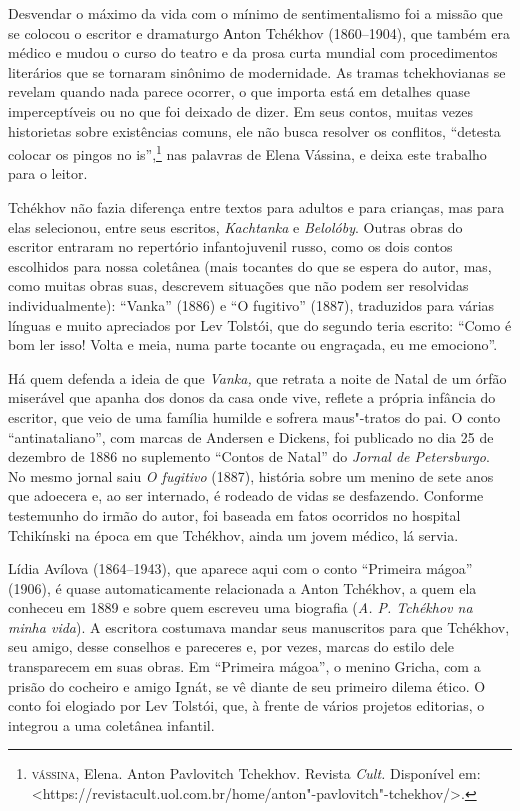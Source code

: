 Desvendar o máximo da vida com o mínimo de sentimentalismo foi a missão
que se colocou o escritor e dramaturgo Аnton Tchékhov (1860--1904), que
também era médico e mudou o curso do teatro e da prosa curta mundial com
procedimentos literários que se tornaram sinônimo de modernidade. As
tramas tchekhovianas se revelam quando nada parece ocorrer, o que
importa está em detalhes quase imperceptíveis ou no que foi deixado de
dizer. Em seus contos, muitas vezes historietas sobre existências
comuns, ele não busca resolver os conflitos, ``detesta colocar os pingos
no is'',\footnote{\textsc{vássina}, Elena. Anton Pavlovitch Tchekhov. Revista
  \emph{Cult.} Disponível em:
  \textless{}https://revistacult.uol.com.br/home/anton"-pavlovitch"-tchekhov/\textgreater{}.}
nas palavras de Elena Vássina, e deixa este trabalho para o leitor.

Tchékhov não fazia diferença entre textos para adultos e para crianças,
mas para elas selecionou, entre seus escritos, \emph{Kachtanka} e
\emph{Belolóby}. Outras obras do escritor entraram no repertório
infantojuvenil russo, como os dois contos escolhidos para nossa
coletânea (mais tocantes do que se espera do autor, mas, como muitas
obras suas, descrevem situações que não podem ser resolvidas
individualmente): ``Vanka'' (1886) e ``O fugitivo''
(1887), traduzidos para várias línguas e muito apreciados por Lev
Tolstói, que do segundo teria escrito: ``Como é bom ler isso! Volta e
meia, numa parte tocante ou engraçada, eu me emociono''.

Há quem defenda a ideia de que \emph{Vanka,} que retrata a noite de Natal
de um órfão miserável que apanha dos donos da casa onde vive, reflete a
própria infância do escritor, que veio de uma família humilde e sofrera
maus"-tratos do pai. O conto ``antinataliano'', com marcas de Andersen e
Dickens, foi publicado no dia 25 de dezembro de 1886 no suplemento
``Contos de Natal'' do \emph{Jornal de Petersburgo}. No mesmo jornal
saiu \emph{O fugitivo} (1887), história sobre um menino de sete
anos que adoecera e, ao ser internado, é rodeado de vidas se desfazendo.
Conforme testemunho do irmão do autor, foi baseada em fatos ocorridos no
hospital Tchikínski na época em que Tchékhov, ainda um jovem médico, lá
servia.

Lídia Avílova (1864--1943), que aparece aqui com o conto ``Primeira
mágoa'' (1906), é quase automaticamente relacionada a Anton Tchékhov, a
quem ela conheceu em 1889 e sobre quem escreveu uma biografia (\emph{A.
P. Tchékhov na minha vida}). A escritora costumava mandar seus
manuscritos para que Tchékhov, seu amigo, desse conselhos e pareceres e,
por vezes, marcas do estilo dele transparecem em suas obras. Em
``Primeira mágoa'', o menino Gricha, com a prisão do
cocheiro e amigo Ignát, se vê diante de seu primeiro dilema ético. O conto foi
elogiado por Lev Tolstói, que, à frente de vários projetos editorias, o
integrou a uma coletânea infantil.

